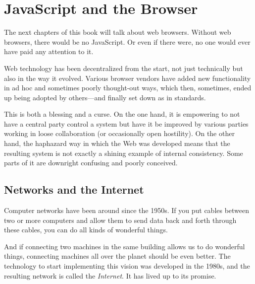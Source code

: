 \chapter{JavaScript and the Browser}\label{browser}


The next chapters of this book will talk about web browsers. Without web browsers, there would be no JavaScript. Or even if there were, no one would ever have paid any attention to it.

Web technology has been decentralized from the start, not just technically but also in the way it evolved. Various browser vendors have added new functionality in ad hoc and sometimes poorly thought-out ways, which then, sometimes, ended up being adopted by others—and finally set down as in standards.

This is both a blessing and a curse. On the one hand, it is empowering to not have a central party control a system but have it be improved by various parties working in loose collaboration (or occasionally open hostility). On the other hand, the haphazard way in which the Web was developed means that the resulting system is not exactly a shining example of internal consistency. Some parts of it are downright confusing and poorly conceived.

\section{Networks and the Internet}

Computer networks have been around since the 1950s. If you put cables between two or more computers and allow them to send data back and forth through these cables, you can do all kinds of wonderful things.

And if connecting two machines in the same building allows us to do wonderful things, connecting machines all over the planet should be even better. The technology to start implementing this vision was developed in the 1980s, and the resulting network is called the \emph{Internet}. It has lived up to its promise.

